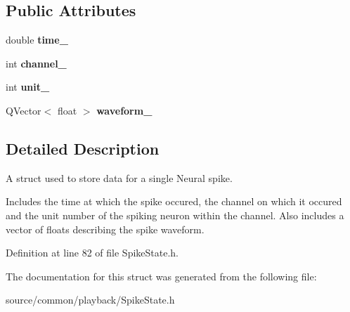 \subsection*{Public Attributes}
\begin{DoxyCompactItemize}
\item 
\hypertarget{struct_picto_1_1_playback_spike_data_a9fccb19ecf9edef902907947b4acb6ce}{double {\bfseries time\-\_\-}}\label{struct_picto_1_1_playback_spike_data_a9fccb19ecf9edef902907947b4acb6ce}

\item 
\hypertarget{struct_picto_1_1_playback_spike_data_ab69d6da437ebfa1e97674eaa47a2f6e6}{int {\bfseries channel\-\_\-}}\label{struct_picto_1_1_playback_spike_data_ab69d6da437ebfa1e97674eaa47a2f6e6}

\item 
\hypertarget{struct_picto_1_1_playback_spike_data_a8e4c365e626b0e771858c2795daed526}{int {\bfseries unit\-\_\-}}\label{struct_picto_1_1_playback_spike_data_a8e4c365e626b0e771858c2795daed526}

\item 
\hypertarget{struct_picto_1_1_playback_spike_data_a6fff9ae6e03e0ce995fbf5de9f4bc9cc}{Q\-Vector$<$ float $>$ {\bfseries waveform\-\_\-}}\label{struct_picto_1_1_playback_spike_data_a6fff9ae6e03e0ce995fbf5de9f4bc9cc}

\end{DoxyCompactItemize}


\subsection{Detailed Description}
A struct used to store data for a single Neural spike. 

Includes the time at which the spike occured, the channel on which it occured and the unit number of the spiking neuron within the channel. Also includes a vector of floats describing the spike waveform. 

Definition at line 82 of file Spike\-State.\-h.



The documentation for this struct was generated from the following file\-:\begin{DoxyCompactItemize}
\item 
source/common/playback/Spike\-State.\-h\end{DoxyCompactItemize}
